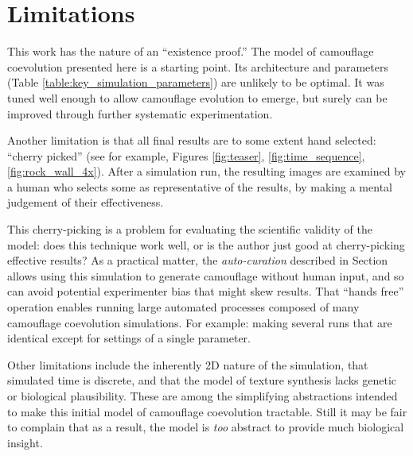 \documentclass[letterpaper]{article}
\newcommand{\jargon}[1]{\textit{#1}}
\newcommand{\runID}{\footnotesize}
\newcommand{\igfour}[1]{\texttt{[image: \#1]}}
\begin{document}


\section{Limitations}
\label{subsec:limitations}
This work has the nature of an ``existence proof.'' The model of camouflage coevolution presented here is a starting point. Its architecture and parameters (Table \ref{table:key_simulation_parameters}) are unlikely to be optimal. It was tuned well enough to allow camouflage evolution to emerge, but surely can be improved through further systematic experimentation.
\par
Another limitation is that all final results are to some extent hand selected: ``cherry picked'' (see for example, Figures \ref{fig:teaser}, \ref{fig:time_sequence}, \ref{fig:rock_wall_4x}). After a simulation run, the resulting images are examined by a human who selects some as representative of the results, by making a mental judgement of their effectiveness.
\par
This cherry-picking is a problem for evaluating the scientific validity of the model: does this technique work well, or is the author just good at cherry-picking effective results? As a practical matter, the \jargon{auto-curation} described in Section  allows using this simulation to generate camouflage without human input, and so can avoid potential experimenter bias that might skew results. That ``hands free'' operation enables running large automated processes composed of many camouflage coevolution simulations. For example: making several runs that are identical except for settings of a single parameter.
\par
Other limitations include the inherently 2D nature of the simulation, that simulated time is discrete, and that the model of texture synthesis lacks genetic or biological plausibility. These are among the simplifying abstractions intended to make this initial model of camouflage coevolution tractable. Still it may be fair to complain that as a result, the model is \textit{too} abstract to provide much biological insight.
\par
\end{document}
